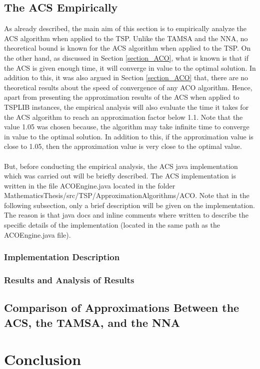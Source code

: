 \documentclass{article}
\begin{document}
\subsection{The ACS Empirically}
As already described, the main aim of this section is to empirically analyze the ACS algorithm when applied to the TSP. Unlike the TAMSA and the NNA, no theoretical bound is known for the ACS algorithm when applied to the TSP. On the other hand, as discussed in Section \ref{section_ACO}, what is known is that if the ACS is given enough time, it will converge in value to the optimal solution. In addition to this, it was also argued in Section \ref{section_ACO} that, there are no theoretical results about the speed of convergence of any ACO algorithm. Hence, apart from presenting the approximation results of the ACS when applied to TSPLIB instances, the empirical analysis will also evaluate the time it takes for the ACS algorithm to reach an approximation factor below 1.1. Note that the value 1.05 was chosen because, the algorithm may take infinite time to converge in value to the optimal solution. In addition to this, if the approximation value is close to 1.05, then the approximation value is very close to the optimal value.\\\\
But, before conducting the empirical analysis, the ACS java implementation which was carried out will be briefly described. The ACS implementation is written in the file ACOEngine.java located in the folder MathematicsThesis/src/TSP/ApproximationAlgorithms/ACO. Note that in the following subsection, only a brief description will be given on the implementation. The reason is that java docs and inline comments where written to describe the specific details of the implementation (located in the same path as the ACOEngine.java file).
\subsubsection{Implementation Description}
\subsubsection{Results and Analysis of Results}
\subsection{Comparison of Approximations Between the ACS, the TAMSA, and the NNA}
\newpage
\section{Conclusion}
\newpage

\nocite{*}

\end{document}
